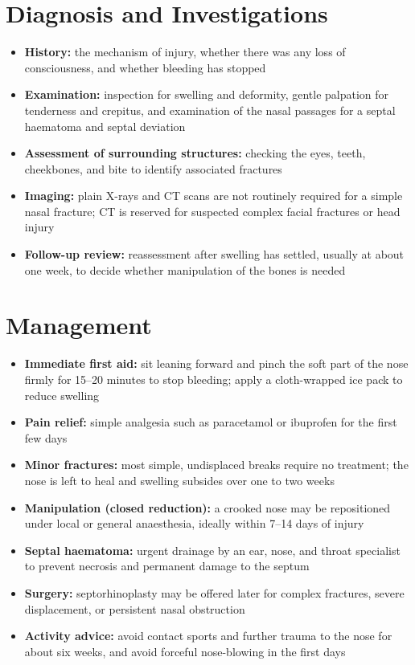 \section*{Diagnosis and Investigations}
\begin{itemize}
    \item \textbf{History:} the mechanism of injury, whether there was any loss of consciousness, and whether bleeding has stopped
    \item \textbf{Examination:} inspection for swelling and deformity, gentle palpation for tenderness and crepitus, and examination of the nasal passages for a septal haematoma and septal deviation
    \item \textbf{Assessment of surrounding structures:} checking the eyes, teeth, cheekbones, and bite to identify associated fractures
    \item \textbf{Imaging:} plain X-rays and CT scans are not routinely required for a simple nasal fracture; CT is reserved for suspected complex facial fractures or head injury
    \item \textbf{Follow-up review:} reassessment after swelling has settled, usually at about one week, to decide whether manipulation of the bones is needed
\end{itemize}

\section*{Management}
\begin{itemize}
    \item \textbf{Immediate first aid:} sit leaning forward and pinch the soft part of the nose firmly for 15--20 minutes to stop bleeding; apply a cloth-wrapped ice pack to reduce swelling
    \item \textbf{Pain relief:} simple analgesia such as paracetamol or ibuprofen for the first few days
    \item \textbf{Minor fractures:} most simple, undisplaced breaks require no treatment; the nose is left to heal and swelling subsides over one to two weeks
    \item \textbf{Manipulation (closed reduction):} a crooked nose may be repositioned under local or general anaesthesia, ideally within 7--14 days of injury
    \item \textbf{Septal haematoma:} urgent drainage by an ear, nose, and throat specialist to prevent necrosis and permanent damage to the septum
    \item \textbf{Surgery:} septorhinoplasty may be offered later for complex fractures, severe displacement, or persistent nasal obstruction
    \item \textbf{Activity advice:} avoid contact sports and further trauma to the nose for about six weeks, and avoid forceful nose-blowing in the first days
\end{itemize}

